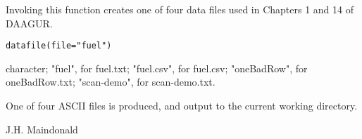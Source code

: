 \begin{Description}\relax
Invoking this function creates one of four data files used
in Chapters 1 and 14 of DAAGUR.
\end{Description}
\begin{Usage}
\begin{verbatim}
datafile(file="fuel")
\end{verbatim}
\end{Usage}
\begin{Arguments}
\begin{ldescription}
\item[\code{file}] character; "fuel", for fuel.txt;
"fuel.csv", for fuel.csv;
"oneBadRow", for oneBadRow.txt;
"scan-demo", for scan-demo.txt.
\end{ldescription}
\end{Arguments}
\begin{Value}
One of four ASCII files is produced, and output to the current
working directory.
\end{Value}
\begin{Author}\relax
J.H. Maindonald
\end{Author}

